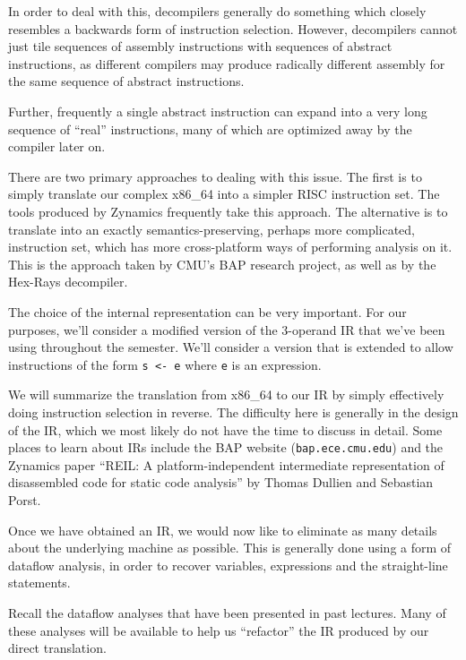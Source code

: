 \documentclass{article}
\begin{document}
In order to deal with this, decompilers generally do something which closely resembles 
a backwards form of instruction selection. However, decompilers cannot just tile sequences
of assembly instructions with sequences of abstract instructions, as different compilers
may produce radically different assembly for the same sequence of abstract instructions.

Further, frequently a single abstract instruction can expand into a very long sequence of ``real''
instructions, many of which are optimized away by the compiler later on.

There are two primary approaches to dealing with this issue. The first is to simply
translate our complex x86\_64 into a simpler RISC instruction set. The tools produced by
Zynamics frequently take this approach. The alternative is to translate into an exactly
semantics-preserving, perhaps more complicated, instruction set, which has more cross-platform
ways of performing analysis on it. This is the approach taken by CMU's BAP research project,
as well as by the Hex-Rays decompiler.

The choice of the internal representation can be very important. For our purposes,
we'll consider a modified version of the $3$-operand IR that we've been using
throughout the semester. We'll consider a version that is extended to allow
instructions of the form \verb+s <- e+ where \verb+e+ is an expression.

We will summarize the translation from x86\_64 to our IR by simply
effectively doing instruction selection in reverse. The difficulty here is
generally in the design of the IR, which we most likely do not have the time to
discuss in detail. Some places to learn about IRs include the BAP website 
(\verb+bap.ece.cmu.edu+) and the Zynamics paper ``REIL: A platform-independent
intermediate representation of disassembled code for static code analysis'' by
Thomas Dullien and Sebastian Porst.

Once we have obtained an IR, we would now like to eliminate as many details 
about the underlying machine as possible. This is generally done using a 
form of dataflow analysis, in order to recover variables, expressions and 
the straight-line statements.

Recall the dataflow analyses that have been presented in past lectures. Many of
these analyses will be available to help us ``refactor'' the IR produced by
our direct translation.
\end{document}

